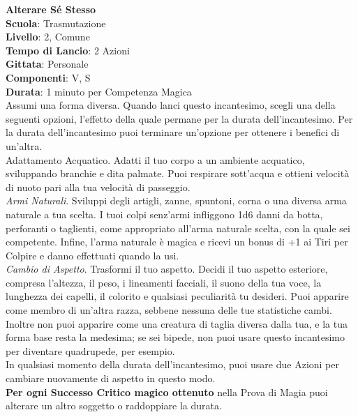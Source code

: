 \begin{multicols}{2}
\medskip\textbf{Alterare Sé Stesso}\\
\textbf{Scuola}: Trasmutazione\\
\textbf{Livello}: 2, Comune\\
\textbf{Tempo di Lancio}: 2 Azioni\\
\textbf{Gittata}: Personale\\
\textbf{Componenti}: V, S\\
\textbf{Durata}: 1 minuto per Competenza Magica\\
Assumi una forma diversa. Quando lanci questo incantesimo, scegli una della seguenti opzioni, l'effetto della quale permane per la durata dell'incantesimo. Per la durata dell'incantesimo puoi terminare un'opzione per ottenere i benefici di un'altra.\\
Adattamento Acquatico. Adatti il tuo corpo a un ambiente acquatico, sviluppando branchie e dita palmate. Puoi respirare sott'acqua e ottieni velocità di nuoto pari alla tua velocità di passeggio.\\
\textit{Armi Naturali}. Sviluppi degli artigli, zanne, spuntoni, corna o una diversa arma naturale a tua scelta. I tuoi colpi senz'armi infliggono 1d6 danni da botta, perforanti o taglienti, come appropriato all'arma naturale scelta, con la quale sei competente. Infine, l'arma naturale è magica e ricevi un bonus di +1 ai Tiri per Colpire e danno effettuati quando la usi.\\
\textit{Cambio di Aspetto}. Trasformi il tuo aspetto. Decidi il tuo aspetto esteriore, compresa l'altezza, il peso, i lineamenti facciali, il suono della tua voce, la lunghezza dei capelli, il colorito e qualsiasi peculiarità tu desideri. Puoi apparire come membro di un'altra razza, sebbene nessuna delle tue statistiche cambi. Inoltre non puoi apparire come una creatura di taglia diversa dalla tua, e la tua forma base resta la medesima; se sei bipede, non puoi usare questo incantesimo per diventare quadrupede, per esempio.\\
In qualsiasi momento della durata dell'incantesimo, puoi usare due Azioni per cambiare nuovamente di aspetto in questo modo.\\
\textbf{Per ogni Successo Critico magico ottenuto} nella Prova di Magia puoi alterare un altro soggetto o raddoppiare la durata.


\end{multicols}
